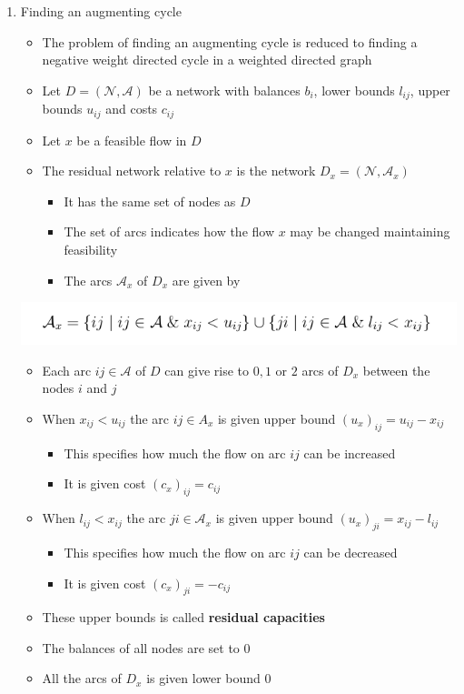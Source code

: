 \documentclass[11pt]{article}
\begin{document}
\begin{enumerate}
\item Finding an augmenting cycle
\label{sec:org97d6302}
\begin{itemize}
\item The problem of finding an augmenting cycle is reduced to finding a negative weight directed cycle in a weighted directed graph
\item Let \(D=(\mathcal N, \mathcal A)\) be a network with balances \(b_i\), lower bounds \(l_{ij}\), upper bounds \(u_{ij}\) and costs \(c_{ij}\)
\item Let \(x\) be a feasible flow in \(D\)
\item The residual network relative to \(x\) is the network \(D_x=(\mathcal N, \mathcal A_x)\)
\begin{itemize}
\item It has the same set of nodes as \(D\)
\item The set of arcs indicates how the flow \(x\) may be changed maintaining feasibility
\item The arcs \(\mathcal A_x\) of \(D_x\) are given by
\end{itemize}
\end{itemize}
\begin{center}
\includegraphics[width=.9\linewidth]{Network Flows/screenshot_2019-03-07_09-07-13.png}
\end{center}
\begin{itemize}
\item Each arc \(ij \in \mathcal A\) of \(D\) can give rise to \(0,1\) or \(2\) arcs of \(D_x\) between the nodes \(i\) and \(j\)
\item When \(x_{ij} < u_{ij}\) the arc \(ij \in A_x\) is given upper bound \((u_x)_{ij} = u_{ij} - x_{ij}\)
\begin{itemize}
\item This specifies how much the flow on arc \(ij\) can be increased
\item It is given cost \((c_x)_{ij} = c_{ij}\)
\end{itemize}
\item When \(l_{ij} < x_{ij}\) the arc \(ji \in \mathcal A_x\) is given upper bound \((u_x)_{ji} = x_{ij} - l_{ij}\)
\begin{itemize}
\item This specifies how much the flow on arc \(ij\) can be decreased
\item It is given cost \((c_x)_{ji} = -c_{ij}\)
\end{itemize}
\item These upper bounds is called \textbf{residual capacities}
\item The balances of all nodes are set to \(0\)
\item All the arcs of \(D_x\) is given lower bound \(0\)


\end{itemize}
\end{enumerate}
\end{document}
